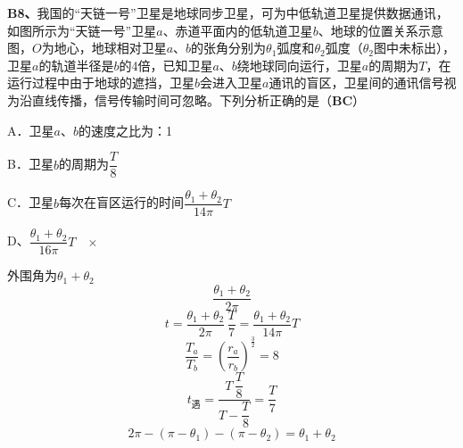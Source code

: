 \begin{problem}[B8]
\textbf{B8、}我国的“天链一号”卫星是地球同步卫星，可为中低轨道卫星提供数据通讯，如图所示为“天链一号”卫星$a$、赤道平面内的低轨道卫星$b$、地球的位置关系示意图，$O$为地心，地球相对卫星$a$、$b$的张角分别为$\theta_1$弧度和$\theta_2$弧度（$\theta_2$图中未标出），卫星$a$的轨道半径是$b$的4倍，已知卫星$a$、$b$绕地球同向运行，卫星$a$的周期为$T$，在运行过程中由于地球的遮挡，卫星$b$会进入卫星$a$通讯的盲区，卫星间的通讯信号视为沿直线传播，信号传输时间可忽略。下列分析正确的是（\textbf{BC}）

\noindent A．卫星$a$、$b$的速度之比为：1%

\noindent B．卫星$b$的周期为$\dfrac{T}{8}$%

\noindent C．卫星$b$每次在盲区运行的时间$\dfrac{\theta_1+\theta_2}{14\pi}T$%

\noindent D、$\dfrac{\theta_1+\theta_2}{16\pi}T$　$\times$%
\begin{solution}
外围角为$\theta_1+\theta_2$
\[ \dfrac{\theta_1+\theta_2}{2\pi} \]
\[ t=\dfrac{\theta_1+\theta_2}{2\pi}\,\dfrac{T}{7}=\dfrac{\theta_1+\theta_2}{14\pi}T \]
\[ \dfrac{T_a}{T_b}=\left(\dfrac{r_a}{r_b}\right)^{\frac{3}{2}}=8 \]
\[ t_{\text{遇}}=\dfrac{T\,\dfrac{T}{8}}{T-\dfrac{T}{8}}=\dfrac{T}{7} \]
\[ 2\pi-(\pi-\theta_1)-(\pi-\theta_2)=\theta_1+\theta_2 \]
\end{solution}
\end{problem}
